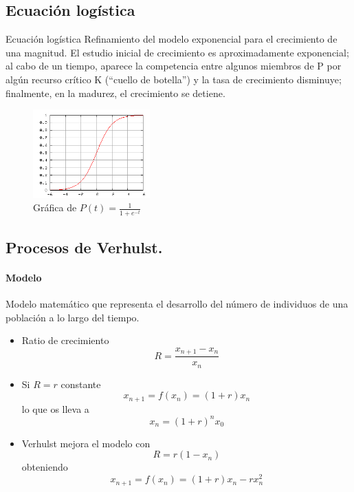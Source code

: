 \documentclass[8pt]{beamer}
\begin{document}
\subsection{Ecuación logística}

\begin{frame}
\begin{block}{Ecuación logística}
Refinamiento del modelo exponencial para el crecimiento de una magnitud. El estudio inicial de crecimiento es aproximadamente exponencial; al cabo de un tiempo, aparece la competencia entre algunos miembros de P por algún recurso crítico K (``cuello de botella'') y la tasa de crecimiento disminuye; finalmente, en la madurez, el crecimiento se detiene.
\end{block}

\begin{figure}[H]
\centering
\includegraphics[width = 0.4\textwidth]{img/EcuacionLogistica.png}
\caption{Gráfica de $P(t) = \frac{1}{1+e^{-t}}$}
\label{fig:EcLogistica}
\end{figure}

\end{frame}

\subsection{Procesos de Verhulst.}

\begin{frame}
\framesubtitle{Modelo}
\begin{definition}
Modelo matemático que representa el desarrollo del número de individuos de una población a lo largo del tiempo.
\end{definition}

\begin{itemize}[<+(1)->]
\item Ratio de crecimiento
\[R=\frac{x_{n+1}-x_n}{x_n}\]

\item Si $R=r$ constante
\[x_{n+1} = f(x_n) = (1+r)x_n\]
lo que os lleva a
\[x_n = (1+r)^nx_0\]

\item Verhulst mejora el modelo con
\[R=r(1-x_n)\]
obteniendo
\begin{equation}\label{eq:Verhulst}
x_{n+1} = f(x_n) = (1+r)x_n - rx_n^2
\end{equation}
\end{itemize}
\end{frame}
\end{document}
